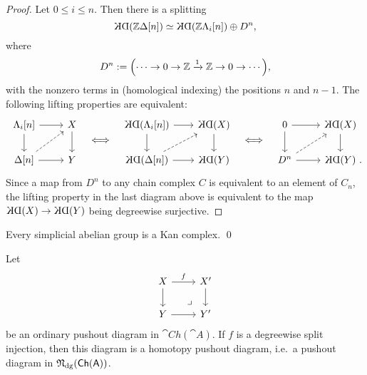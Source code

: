 \begin{proof}
    Let $0\leq i\leq n$. Then there is a splitting
    \[ \KD(\mathbb{Z}\Delta[n]) \simeq \KD(\mathbb{Z}\Lambda_i[n]) \oplus D^n, \]
    where 
    \[ D^n := \Bigl(\cdots\to0\to\mathbb{Z}\xrightarrow{1}\mathbb{Z}\to0\to\cdots\Bigr), \]
    with the nonzero terms in (homological indexing) the positions $n$ and $n-1$.
    The following lifting properties are equivalent:
    \[ \begin{tikzcd}
        \Lambda_i[n] \ar[r]\ar[d] & X \ar[d] \\
        \Delta[n]\ar[r]\ar[ur,dashed] & Y
    \end{tikzcd} \enspace\iff\enspace \begin{tikzcd}[column sep=2em]
        \KD(\Lambda_i[n]) \ar[r]\ar[d] & \KD(X) \ar[d] \\
        \KD(\Delta[n])\ar[r]\ar[ur,dashed] & \KD(Y)
    \end{tikzcd} \enspace\iff\enspace \begin{tikzcd}
        0 \ar[r]\ar[d] & \KD(X) \ar[d] \\
        D^n \ar[r]\ar[ur,dashed] & \KD(Y)\rlap{\ .}
    \end{tikzcd} \]
    Since a map from $D^n$ to any chain complex $C$
    is equivalent to an element of $C_n$,
    the lifting property in the last diagram above is equivalent to
    the map $\KD(X)\to\KD(Y)$ being degreewise surjective.
\end{proof}

\begin{corollary}\label{thm-9-s}
    Every simplicial abelian group is a Kan complex. \qed
\end{corollary}

\begin{corollary}\label{cor-9-o}
    Let 
    \[\begin{tikzcd}
        X\ar[r,"f"]\ar[d]\ar[dr,phantom,pos=.75,"\lrcorner"] & X'\ar[d] \\
        Y\ar[r] & Y'
    \end{tikzcd}\]
    be an ordinary pushout diagram in $\cat{Ch}(\cat{A})$.
    If $f$ is a degreewise split injection,
    then this diagram is a homotopy pushout diagram,
    i.e.\ a pushout diagram in $\mathfrak{N}_{\mathrm{dg}}(\textup{\textsf{Ch}}(\textup{\textsf{A}}))$.
\end{corollary}

